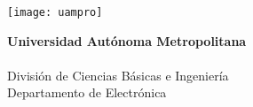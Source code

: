 \documentclass[10pt,letterpaper]{article}
\begin{document}
 

\begin{flushright}
	{\small
		\begin{minipage}[b]{0.17\linewidth}
			\texttt{[image: uampro]}
		\end{minipage}
		\begin{minipage}[b]{0.3\linewidth}
			\textbf{Universidad Autónoma Metropolitana}\\ %
			\\
			División de Ciencias Básicas e Ingeniería\\ %
			Departamento de Electrónica
		\end{minipage}
	}
\end{flushright}

{\Large {}}\\
{\large {}}
\vspace{0.2cm} 
\end{document}
